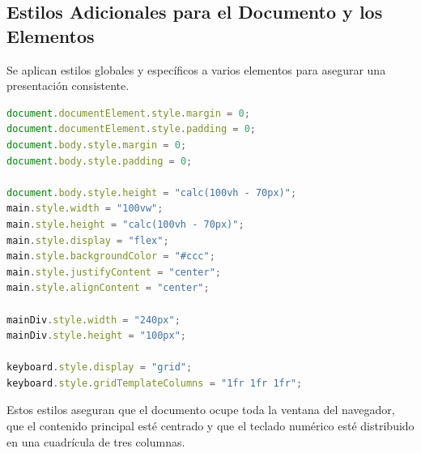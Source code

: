 \subsection*{Estilos Adicionales para el Documento y los Elementos}

Se aplican estilos globales y específicos a varios elementos para asegurar una presentación consistente.

\begin{lstlisting}[language=JavaScript]
document.documentElement.style.margin = 0;
document.documentElement.style.padding = 0;
document.body.style.margin = 0;
document.body.style.padding = 0;

document.body.style.height = "calc(100vh - 70px)";
main.style.width = "100vw";
main.style.height = "calc(100vh - 70px)";
main.style.display = "flex";
main.style.backgroundColor = "#ccc";
main.style.justifyContent = "center";
main.style.alignContent = "center";

mainDiv.style.width = "240px";
mainDiv.style.height = "100px";

keyboard.style.display = "grid";
keyboard.style.gridTemplateColumns = "1fr 1fr 1fr";
\end{lstlisting}

Estos estilos aseguran que el documento ocupe toda la ventana del navegador, que el contenido principal esté centrado y que el teclado numérico esté distribuido en una cuadrícula de tres columnas.
